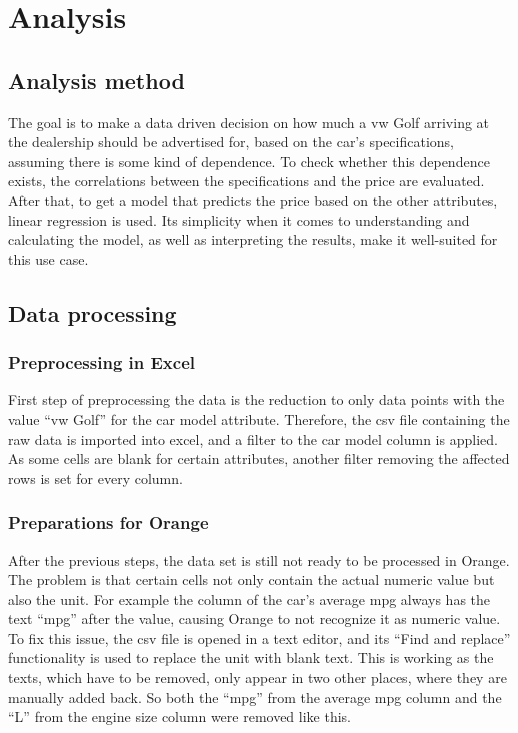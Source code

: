 \chapter{Analysis}
\section{Analysis method}
The goal is to make a data driven decision on how much a \ac{vw} Golf arriving at the dealership should be advertised for,
based on the car's specifications, assuming there is some kind of dependence.
To check whether this dependence exists, the correlations between the specifications and the price are evaluated.
After that, to get a model that predicts the price based on the other attributes, linear regression is used.
Its simplicity when it comes to understanding and calculating the model, as well as interpreting the results, make it well-suited
for this use case.    

\section{Data processing}
\subsection{Preprocessing in Excel}
First step of preprocessing the data is the reduction to only data points with the value \enquote{\ac{vw} Golf} for the car model attribute. Therefore, the \ac{csv} file containing the raw data is
imported into \ac{excel}, and a filter to the car model column is applied. As some cells are blank for certain attributes, another filter removing the affected rows is set for every column. 

\subsection{Preparations for Orange}
After the previous steps, the data set is still not ready to be processed in Orange. The problem is that certain cells not only contain the actual numeric value but also the 
unit. For example the column of the car's average \ac{mpg} always has the text \enquote{mpg} after the value, causing Orange to not recognize it as 
numeric value. To fix this issue, the \ac{csv} file is opened in a text editor, and its \enquote{Find and replace} functionality is used to replace the unit with blank text.
This is working as the texts,
which have to be removed, only appear in two other places, where they are manually added back. So both the \enquote{mpg} from the average \ac{mpg} column and the \enquote{L}
from the engine size column were removed like this.

